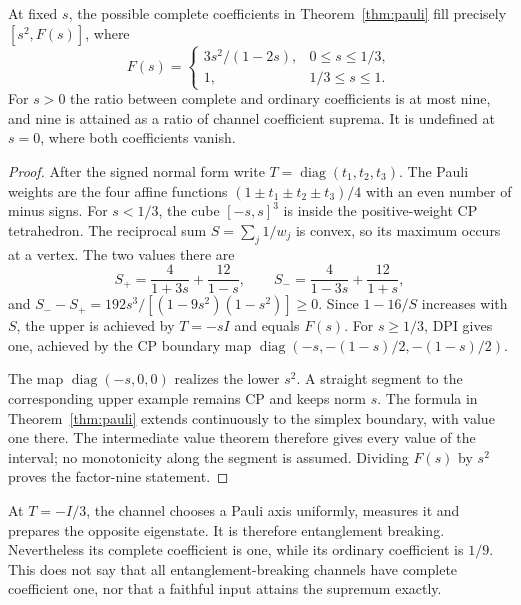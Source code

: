 \begin{theorem}\label{thm:envelope}
At fixed \(s\), the possible complete coefficients in Theorem~\ref{thm:pauli} fill precisely \([s^2,F(s)]\), where
\[
 F(s)=\begin{cases}3s^2/(1-2s),&0\le s\le1/3,\\1,&1/3\le s\le1.\end{cases}
\]
For \(s>0\) the ratio between complete and ordinary coefficients is at most nine, and nine is attained as a ratio of channel coefficient suprema. It is undefined at \(s=0\), where both coefficients vanish.
\end{theorem}
\begin{proof}
After the signed normal form write \(T=\operatorname{diag}(t_1,t_2,t_3)\). The Pauli weights are the four affine functions \((1\pm t_1\pm t_2\pm t_3)/4\) with an even number of minus signs. For \(s<1/3\), the cube \([-s,s]^3\) is inside the positive-weight CP tetrahedron. The reciprocal sum \(S=\sum_j1/w_j\) is convex, so its maximum occurs at a vertex. The two values there are
\[
 S_+=\frac4{1+3s}+\frac{12}{1-s},\qquad S_-=\frac4{1-3s}+\frac{12}{1+s},
\]
and \(S_--S_+=192s^3/[(1-9s^2)(1-s^2)]\ge0\). Since \(1-16/S\) increases with \(S\), the upper is achieved by \(T=-sI\) and equals \(F(s)\). For \(s\ge1/3\), DPI gives one, achieved by the CP boundary map
\(\operatorname{diag}(-s,-(1-s)/2,-(1-s)/2)\).

The map \(\operatorname{diag}(-s,0,0)\) realizes the lower \(s^2\). A straight segment to the corresponding upper example remains CP and keeps norm \(s\). The formula in Theorem~\ref{thm:pauli} extends continuously to the simplex boundary, with value one there. The intermediate value theorem therefore gives every value of the interval; no monotonicity along the segment is assumed. Dividing \(F(s)\) by \(s^2\) proves the factor-nine statement.
\end{proof}

At \(T=-I/3\), the channel chooses a Pauli axis uniformly, measures it and prepares the opposite eigenstate. It is therefore entanglement breaking. Nevertheless its complete coefficient is one, while its ordinary coefficient is \(1/9\). This does not say that all entanglement-breaking channels have complete coefficient one, nor that a faithful input attains the supremum exactly.
